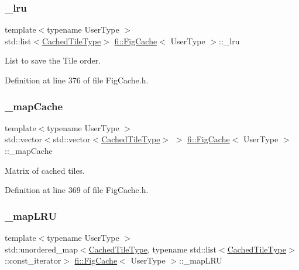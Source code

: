 \subsubsection{\texorpdfstring{\+\_\+lru}{\_lru}}
{\footnotesize\ttfamily template$<$typename User\+Type $>$ \\
std\+::list$<$\hyperlink{classfi_1_1FigCache_a7b9bbc4a832c01c3a461f573445c3c41}{Cached\+Tile\+Type}$>$ \hyperlink{classfi_1_1FigCache}{fi\+::\+Fig\+Cache}$<$ User\+Type $>$\+::\+\_\+lru\hspace{0.3cm}{\ttfamily [private]}}



List to save the Tile order. 



Definition at line 376 of file Fig\+Cache.\+h.

\mbox{\label{classfi_1_1FigCache_a2c2c5ed1bb3eeb705920ef48e623f1b4}} 
\subsubsection{\texorpdfstring{\+\_\+map\+Cache}{\_mapCache}}
{\footnotesize\ttfamily template$<$typename User\+Type $>$ \\
std\+::vector$<$std\+::vector$<$\hyperlink{classfi_1_1FigCache_a7b9bbc4a832c01c3a461f573445c3c41}{Cached\+Tile\+Type}$>$ $>$ \hyperlink{classfi_1_1FigCache}{fi\+::\+Fig\+Cache}$<$ User\+Type $>$\+::\+\_\+map\+Cache\hspace{0.3cm}{\ttfamily [private]}}



Matrix of cached tiles. 



Definition at line 369 of file Fig\+Cache.\+h.

\mbox{\label{classfi_1_1FigCache_a90833a82a97de1cdc869dddd313fab1d}} 
\subsubsection{\texorpdfstring{\+\_\+map\+L\+RU}{\_mapLRU}}
{\footnotesize\ttfamily template$<$typename User\+Type $>$ \\
std\+::unordered\+\_\+map$<$\hyperlink{classfi_1_1FigCache_a7b9bbc4a832c01c3a461f573445c3c41}{Cached\+Tile\+Type}, typename std\+::list$<$\hyperlink{classfi_1_1FigCache_a7b9bbc4a832c01c3a461f573445c3c41}{Cached\+Tile\+Type}$>$\+::const\+\_\+iterator$>$ \hyperlink{classfi_1_1FigCache}{fi\+::\+Fig\+Cache}$<$ User\+Type $>$\+::\+\_\+map\+L\+RU\hspace{0.3cm}{\ttfamily [private]}}



